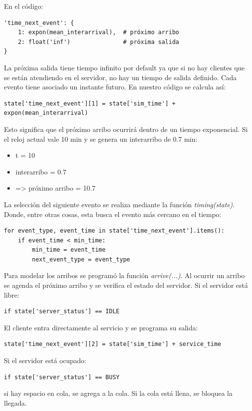 \documentclass{article}
\begin{document}
En el código:
\begin{verbatim}
'time_next_event': {
    1: expon(mean_interarrival),  # próximo arribo
    2: float('inf')               # próxima salida
}
\end{verbatim}

La próxima salida tiene tiempo infinito por default ya que si no hay clientes que se están atendiendo en el servidor, no hay un tiempo de salida definido. Cada evento tiene asociado un instante futuro. En nuestro código se calcula así:

\begin{verbatim}
state['time_next_event'][1] = state['sim_time'] + expon(mean_interarrival)
\end{verbatim}

Esto significa que el próximo arribo ocurrirá dentro de un tiempo exponencial. Si el reloj actual vale 10 min y se genera un interarribo de 0.7 min:
\begin{itemize}
    \item t = 10
    \item interarribo = 0.7
    \item => próximo arribo = 10.7
\end{itemize}

La selección del siguiente evento se realiza mediante la función \textit{timing(state)}. Donde, entre otras cosas, esta busca el evento más cercano en el tiempo:
\begin{verbatim}
for event_type, event_time in state['time_next_event'].items():
    if event_time < min_time:
        min_time = event_time
        next_event_type = event_type
\end{verbatim}

Para modelar los arribos se programó la función \textit{arrive(...)}. Al ocurrir un arribo se agenda el próximo arribo y se verifica el estado del servidor. Si el servidor está libre:
\begin{verbatim}
if state['server_status'] == IDLE
\end{verbatim}
El cliente entra directamente al servicio y se programa su salida:
\begin{verbatim}
state['time_next_event'][2] = state['sim_time'] + service_time
\end{verbatim}

Si el servidor está ocupado:
\begin{verbatim}
if state['server_status'] == BUSY
\end{verbatim}
si hay espacio en cola, se agrega a la cola. Si la cola está llena, se bloquea la llegada.
\end{document}
